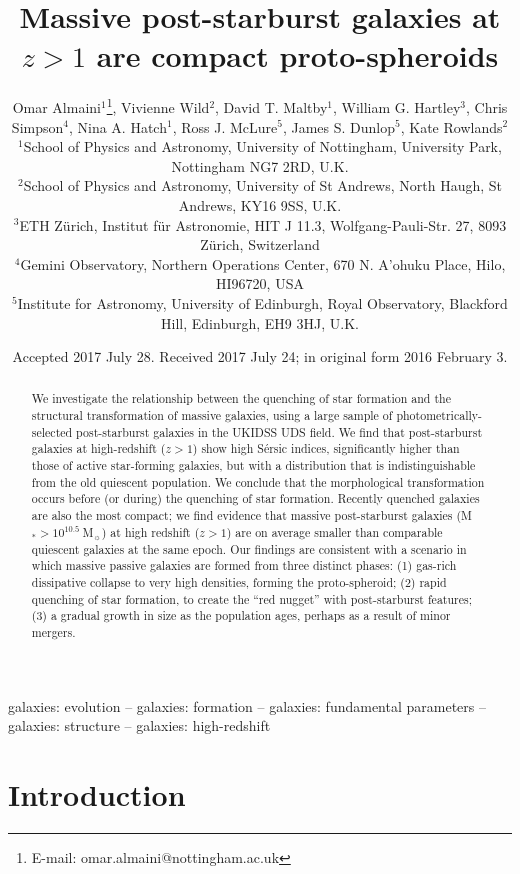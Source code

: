 \documentclass[a4paper,fleqn,usenatbib,useAMS]{mnras}
\title[Massive PSBs at $z>1$ are compact
  proto-spheroids]{Massive post-starburst galaxies at $z>1$ are
  compact proto-spheroids}
\author[O. Almaini et al.]{Omar Almaini$^{1}$\thanks{E-mail:
    omar.almaini@nottingham.ac.uk}, Vivienne Wild$^{2}$, David T.
  Maltby$^{1}$, William G. Hartley$^{3}$, \newauthor 
Chris Simpson$^{4}$, 
  Nina A. Hatch$^{1}$,  
Ross J. McLure$^{5}$, James S. Dunlop$^{5}$,
  Kate Rowlands$^{2}$ \\ $^{1}$School of Physics and Astronomy,
  University of Nottingham, University Park, Nottingham NG7 2RD,
  U.K. \\ $^2$School of Physics and Astronomy, University of St
  Andrews, North Haugh, St Andrews, KY16 9SS, U.K. \\ $^3$ETH
  Z\"urich, Institut f\"ur Astronomie, HIT J 11.3,
  Wolfgang-Pauli-Str. 27, 8093 Z\"urich, Switzerland 
\\ $^4$Gemini Observatory, Northern Operations Center, 670 N. A'ohuku Place, Hilo, HI96720, USA
\\ $^5$Institute
  for Astronomy, University of Edinburgh, Royal Observatory, Blackford
  Hill, Edinburgh, EH9 3HJ, U.K. \\ }
\date{Accepted 2017 July 28. Received 2017 July 24; in original form 2016 February 3.}
\begin{document}
\label{firstpage}
\pagerange{\pageref{firstpage}--\pageref{lastpage}}
\maketitle


\begin{abstract}

We investigate the relationship between the quenching of star
formation and the structural transformation of massive galaxies, using
a large sample of photometrically-selected post-starburst galaxies in
the UKIDSS UDS field. We find that post-starburst galaxies at
high-redshift ($z>1$) show high S\'{e}rsic indices, significantly
higher than those of active star-forming galaxies, but with a
distribution that is indistinguishable from the old quiescent
population.  We conclude that the morphological transformation occurs
before (or during) the quenching of star formation.  Recently quenched
galaxies are also the most compact; we find evidence that massive
post-starburst galaxies (M$_{\ast}> 10^{10.5} ~$M$_{\sun}$) at high
redshift ($z>1$) are  on average smaller than comparable quiescent
galaxies at the same epoch.  Our findings are consistent with a
scenario in which massive passive galaxies are formed from three
distinct phases: (1) gas-rich dissipative collapse to very high
densities, forming the proto-spheroid; (2) rapid quenching of star
formation, to create the ``red nugget'' with post-starburst features;
(3) a gradual growth in size as the population ages, perhaps as a
result of minor mergers.




\end{abstract}

\begin{keywords}
galaxies: evolution -- galaxies: formation -- galaxies: fundamental
parameters -- galaxies: structure -- galaxies: high-redshift
\end{keywords}



\section{Introduction}
\label{sec:intro}
\end{document}
